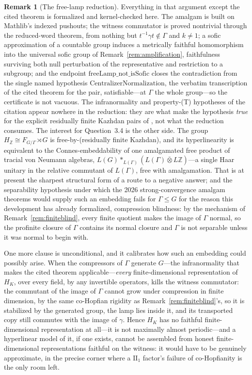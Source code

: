 \documentclass[11pt]{amsart}
\theoremstyle{definition}
\newtheorem{remark}[theorem]{Remark}
\theoremstyle{plain}
\newcommand{\Z}{\mathbb Z}
\begin{document}
\begin{remark}[The free-lamp reduction]
Everything in that argument except the cited theorem is formalized and kernel-checked here.  The amalgam is built on Mathlib's indexed pushouts; the witness commutator is proved nontrivial through the reduced-word theorem, from nothing but \(t^{-1}\gamma t\notin\Gamma\) and \(k\neq1\); a sofic approximation of a countable group induces a metrically faithful homomorphism into the universal sofic group of Remark~\ref{rem:amplification}, faithfulness surviving both null perturbation of the representative and restriction to a subgroup; and the endpoint \(\mathrm{freeLamp\_not\_isSofic}\) closes the contradiction from the single named hypothesis \(\mathrm{CentralizerNormalization}\), the verbatim transcription of the cited theorem for the pair, satisfiable---at \(\Gamma\) the whole group---so the certificate is not vacuous.  The infranormality and property-(T) hypotheses of the citation appear nowhere in the reduction: they are what make the hypothesis \emph{true} for the explicit residually finite Kazhdan pairs of \cite{KunThom26}, not what the reduction consumes.  The interest for Question~3.4 is the other side.  The group \(H_\Z\cong F_{G/\Gamma}\rtimes G\) is free-by-(residually finite Kazhdan), and its hyperlinearity is equivalent to the Connes-embeddability of one amalgamated free product of tracial von Neumann algebras, \(L(G)*_{L(\Gamma)}(L(\Gamma)\mathbin{\bar\otimes}L\Z)\)---a single Haar unitary in the relative commutant of \(L(\Gamma)\), free with amalgamation.  That is at present the sharpest structural form of a route to a negative answer; and the separability hypothesis under which the 2026 strong-convergence amalgam theorems would supply such an embedding fails for \(\Gamma\leq G\) for the reason this development has already formalized, compression blindness: by the mechanism of Remark~\ref{rem:finiteblind}, every finite quotient makes the image of \(\Gamma\) normal, so the profinite closure of \(\Gamma\) contains its normal closure and \(\Gamma\) is not separable unless it was normal to begin with.

One more clause is unconditional, and it calibrates how such an embedding could possibly arise.  When the compressors of \(\Gamma\) generate \(G\)---the infranormality that makes the cited theorem applicable---\emph{every} finite-dimensional representation of \(H_K\), over every field, by any invertible operators, kills the witness commutator: the commutant of the image of \(\Gamma\) cannot grow under compression in finite dimension, by the same co-Hopfian rigidity as Remark~\ref{rem:finiteblind}'s, so it is stabilized by the generated group, the lamp lies inside it, and its transported copy still commutes with the image of \(\gamma\).  Hence \(H_K\) has no faithful finite-dimensional representation at all---it is not maximally almost periodic---and a hyperlinear model of it, if one exists, cannot be assembled from honest finite-dimensional representations faithful on the witness: it would have to be genuinely approximate, in the precise corner where a \(\mathrm{II}_1\) factor's failure of co-Hopfianity is the only room left.
\end{remark}
\end{document}

